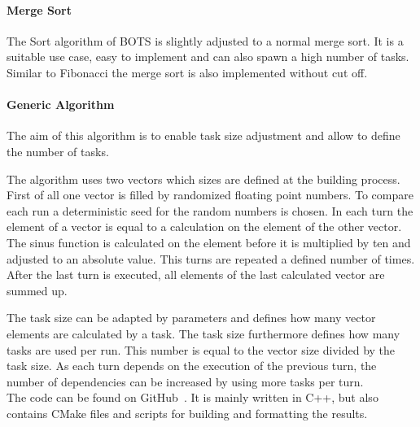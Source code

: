   \paragraph{Merge Sort}
  The Sort algorithm of BOTS is slightly adjusted to a normal merge sort.
  It is a suitable use case, easy to implement and can also spawn a high number of tasks.
  Similar to Fibonacci the merge sort is also implemented without cut off. 
  \\
  
  \paragraph{Generic Algorithm}
  The aim of this algorithm is to enable task size adjustment and allow to define the number of tasks.
  
  The algorithm uses two vectors which sizes are defined at the building process.
  First of all one vector is filled by randomized floating point numbers.
  To compare each run a deterministic seed for the random numbers is chosen.
  In each turn the element of a vector is equal to a calculation on the element of the other vector.
  The sinus function is calculated on the element before it is multiplied by ten and adjusted to an absolute value.
  This turns are repeated a defined number of times.
  After the last turn is executed, all elements of the last calculated vector are summed up.
  
  The task size can be adapted by parameters and defines how many vector elements are calculated by a task.
  The task size furthermore defines how many tasks are used per run.
  This number is equal to the vector size divided by the task size.
  As each turn depends on the execution of the previous turn, the number of dependencies can be increased by using more tasks per turn.
\\

The code can be found on GitHub~\cite{t0BEE.2020}.
It is mainly written in C++, but also contains CMake files and scripts for building and formatting the results.
